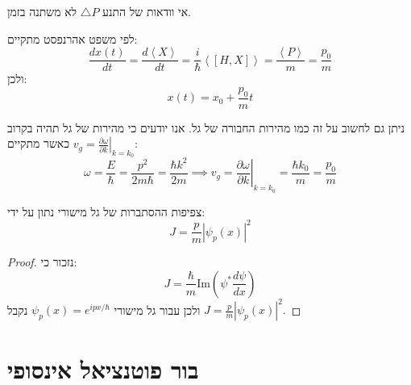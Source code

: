 \documentclass{tstextbook}
\begin{document}
\begin{corollary}
אי וודאות של התנע \(\triangle P\) לא משתנה בזמן.

\end{corollary}
\begin{proposition}
לפי משפט אהרנפסט מתקיים:
$$\frac{d x\left(t\right)}{d t}=\frac{d\left\langle X\right\rangle}{d t}=\frac{i}{\hbar}\left\langle\left[H,X\right]\right\rangle=\frac{\left\langle P\right\rangle}{m}=\frac{p_{0}}{m}$$
ולכן:
$$x\left(t\right)=x_{0}+{\frac{p_{0}}{m}}t$$

\end{proposition}
\begin{remark}
ניתן גם לחשוב על זה כמו מהירות החבורה של גל. אנו יודעים כי מהירות של גל תהיה בקרוב \(v_{g}=\left.\frac{\partial\omega}{\partial k}\right|_{k=k_{0}}\) כאשר מתקיים:
$$\omega={\frac{E}{\hbar}}={\frac{p^{2}}{2m\hbar}}={\frac{\hbar k^{2}}{2m}} \implies v_{g}=\left.{\frac{\partial\omega}{\partial k}}\right|_{k=k_{0}}={\frac{\hbar k_{0}}{m}}={\frac{p_{0}}{m}}$$

\end{remark}
\begin{proposition}
צפיפות ההסתברות של גל מישורי נתון על ידי:
$$J={\frac{p}{m}}|\psi_{p}(x)|^{2}$$

\end{proposition}
\begin{proof}
נזכור כי:
$$J={\frac{\hbar}{m}}\mathrm{Im}\left(\psi^{*}{\frac{d\psi}{d x}}\right)$$
ולכן עבור גל מישורי \(\psi_{p}(x)=e^{ ipx/\hbar }\) נקבל \(J={\frac{p}{m}}|\psi_{p}(x)|^{2}.\)

\end{proof}
\section{בור פוטנציאל אינסופי}
\end{document}

